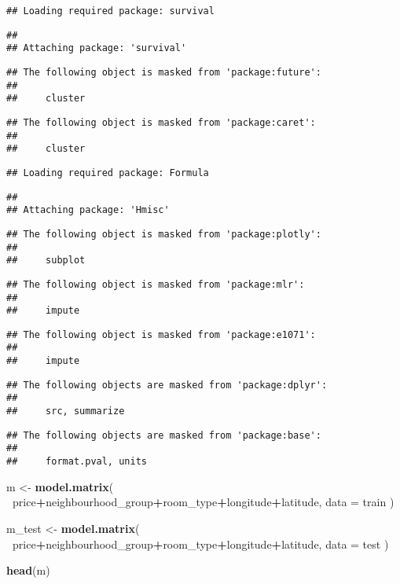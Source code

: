\documentclass[
]{article}
\newenvironment{Shaded}{\begin{snugshade}}{\end{snugshade}}
\newcommand{\DataTypeTok}[1]{\textcolor[rgb]{0.13,0.29,0.53}{#1}}
\newcommand{\KeywordTok}[1]{\textcolor[rgb]{0.13,0.29,0.53}{\textbf{#1}}}
\newcommand{\NormalTok}[1]{#1}
\newcommand{\OperatorTok}[1]{\textcolor[rgb]{0.81,0.36,0.00}{\textbf{#1}}}
\newcommand{\StringTok}[1]{\textcolor[rgb]{0.31,0.60,0.02}{#1}}
\begin{document}
\begin{verbatim}
## Loading required package: survival
\end{verbatim}

\begin{verbatim}
## 
## Attaching package: 'survival'
\end{verbatim}

\begin{verbatim}
## The following object is masked from 'package:future':
## 
##     cluster
\end{verbatim}

\begin{verbatim}
## The following object is masked from 'package:caret':
## 
##     cluster
\end{verbatim}

\begin{verbatim}
## Loading required package: Formula
\end{verbatim}

\begin{verbatim}
## 
## Attaching package: 'Hmisc'
\end{verbatim}

\begin{verbatim}
## The following object is masked from 'package:plotly':
## 
##     subplot
\end{verbatim}

\begin{verbatim}
## The following object is masked from 'package:mlr':
## 
##     impute
\end{verbatim}

\begin{verbatim}
## The following object is masked from 'package:e1071':
## 
##     impute
\end{verbatim}

\begin{verbatim}
## The following objects are masked from 'package:dplyr':
## 
##     src, summarize
\end{verbatim}

\begin{verbatim}
## The following objects are masked from 'package:base':
## 
##     format.pval, units
\end{verbatim}

\begin{Shaded}
\begin{Highlighting}[]
\NormalTok{m <-}\StringTok{ }\KeywordTok{model.matrix}\NormalTok{( }
  \OperatorTok{~}\NormalTok{price}\OperatorTok{+}\NormalTok{neighbourhood_group}\OperatorTok{+}\NormalTok{room_type}\OperatorTok{+}\NormalTok{longitude}\OperatorTok{+}\NormalTok{latitude,}
  \DataTypeTok{data =}\NormalTok{ train }
\NormalTok{)}

\NormalTok{m_test  <-}\StringTok{ }\KeywordTok{model.matrix}\NormalTok{( }
  \OperatorTok{~}\NormalTok{price}\OperatorTok{+}\NormalTok{neighbourhood_group}\OperatorTok{+}\NormalTok{room_type}\OperatorTok{+}\NormalTok{longitude}\OperatorTok{+}\NormalTok{latitude,}
  \DataTypeTok{data =}\NormalTok{ test }
\NormalTok{)}

\KeywordTok{head}\NormalTok{(m)}
\end{Highlighting}
\end{Shaded}
\end{document}
